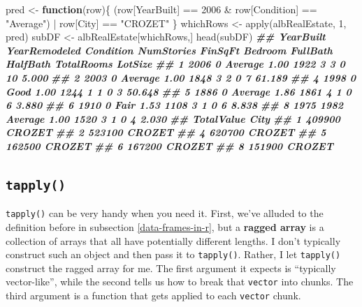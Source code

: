 \documentclass[
  12pt,
]{krantz}
\makeatletter
\newenvironment{Shaded}{\begin{snugshade}}{\end{snugshade}}
\newcommand{\ControlFlowTok}[1]{\textcolor[rgb]{0.27,0.27,0.27}{\textbf{#1}}}
\newcommand{\DecValTok}[1]{\textcolor[rgb]{0.06,0.06,0.06}{#1}}
\newcommand{\DocumentationTok}[1]{\textcolor[rgb]{0.37,0.37,0.37}{\textbf{\textit{#1}}}}
\newcommand{\FunctionTok}[1]{\textcolor[rgb]{0,0,0}{#1}}
\newcommand{\NormalTok}[1]{#1}
\newcommand{\OtherTok}[1]{\textcolor[rgb]{0.37,0.37,0.37}{#1}}
\newcommand{\SpecialCharTok}[1]{\textcolor[rgb]{0,0,0}{#1}}
\newcommand{\StringTok}[1]{\textcolor[rgb]{0.5,0.5,0.5}{#1}}
\newenvironment{kframe}{%
\medskip{}
\setlength{\fboxsep}{.8em}
 \def\at@end@of@kframe{}%
 \ifinner\ifhmode%
  \def\at@end@of@kframe{\end{minipage}}%
  \begin{minipage}{\columnwidth}%
 \fi\fi%
 \def\FrameCommand##1{\hskip\@totalleftmargin \hskip-\fboxsep
 \colorbox{shadecolor}{##1}\hskip-\fboxsep
     \hskip-\linewidth \hskip-\@totalleftmargin \hskip\columnwidth}%
 \MakeFramed {\advance\hsize-\width
   \@totalleftmargin\z@ \linewidth\hsize
   \@setminipage}}%
 {\par\unskip\endMakeFramed%
 \at@end@of@kframe}
\renewenvironment{Shaded}{\begin{kframe}}{\end{kframe}}
\makeatother
\begin{document}
\begin{Shaded}
\begin{Highlighting}[]
\NormalTok{pred }\OtherTok{\textless{}{-}} \ControlFlowTok{function}\NormalTok{(row)\{}
\NormalTok{  (row[}\StringTok{\textquotesingle{}YearBuilt\textquotesingle{}}\NormalTok{] }\SpecialCharTok{==} \DecValTok{2006} \SpecialCharTok{\&}\NormalTok{ row[}\StringTok{\textquotesingle{}Condition\textquotesingle{}}\NormalTok{] }\SpecialCharTok{==} \StringTok{"Average"}\NormalTok{) }\SpecialCharTok{|}\NormalTok{ row[}\StringTok{\textquotesingle{}City\textquotesingle{}}\NormalTok{] }\SpecialCharTok{==} \StringTok{"CROZET"}
\NormalTok{\}}
\NormalTok{whichRows }\OtherTok{\textless{}{-}} \FunctionTok{apply}\NormalTok{(albRealEstate, }\DecValTok{1}\NormalTok{, pred)}
\NormalTok{subDF }\OtherTok{\textless{}{-}}\NormalTok{ albRealEstate[whichRows,]}
\FunctionTok{head}\NormalTok{(subDF)}
\DocumentationTok{\#\#   YearBuilt YearRemodeled Condition NumStories FinSqFt Bedroom FullBath HalfBath TotalRooms LotSize}
\DocumentationTok{\#\# 1      2006             0   Average       1.00    1922       3        3        0         10   5.000}
\DocumentationTok{\#\# 2      2003             0   Average       1.00    1848       3        2        0          7  61.189}
\DocumentationTok{\#\# 4      1998             0      Good       1.00    1244       1        1        0          3  50.648}
\DocumentationTok{\#\# 5      1886             0   Average       1.86    1861       4        1        0          6   3.880}
\DocumentationTok{\#\# 6      1910             0      Fair       1.53    1108       3        1        0          6   8.838}
\DocumentationTok{\#\# 8      1975          1982   Average       1.00    1520       3        1        0          4   2.030}
\DocumentationTok{\#\#   TotalValue   City}
\DocumentationTok{\#\# 1     409900 CROZET}
\DocumentationTok{\#\# 2     523100 CROZET}
\DocumentationTok{\#\# 4     620700 CROZET}
\DocumentationTok{\#\# 5     162500 CROZET}
\DocumentationTok{\#\# 6     167200 CROZET}
\DocumentationTok{\#\# 8     151900 CROZET}
\end{Highlighting}
\end{Shaded}

\hypertarget{tapply}{%
\subsection{\texorpdfstring{\texttt{tapply()}}{tapply()}}\label{tapply}}

\texttt{tapply()} can be very handy when you need it. First, we've alluded to the definition before in subsection \ref{data-frames-in-r}, but a \textbf{ragged array} is a collection of arrays that all have potentially different lengths. I don't typically construct such an object and then pass it to \texttt{tapply()}. Rather, I let \texttt{tapply()} construct the ragged array for me. The first argument it expects is ``typically vector-like'', while the second tells us how to break that \texttt{vector} into chunks. The third argument is a function that gets applied to each \texttt{vector} chunk.
\end{document}
